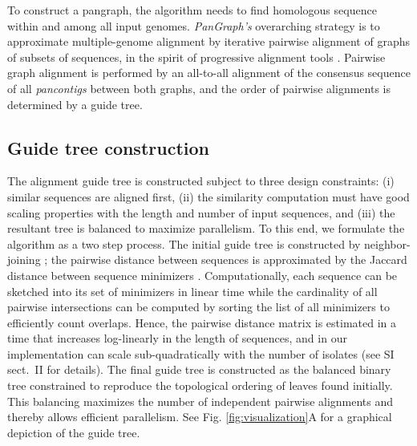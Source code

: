 \documentclass[aps,rmp,preprint,superscriptaddress,10pt,linenumbers]{revtex4-1}
\newcommand{\SIalgo}{II}
\begin{document}
To construct a pangraph, the algorithm needs to find homologous sequence within and among all input genomes.
\emph{PanGraph's} overarching strategy is to approximate multiple-genome alignment by iterative pairwise alignment of graphs of subsets of sequences, in the spirit of progressive alignment tools \cite{feng1987progressive,darling2010progressivemauve,armstrong2020progressive}.
Pairwise graph alignment is performed by an all-to-all alignment of the consensus sequence of all \emph{pancontigs} between both graphs, and the order of pairwise alignments is determined by a guide tree.

\subsection{Guide tree construction}
The alignment guide tree is constructed subject to three design constraints: (i) similar sequences are aligned first, (ii) the similarity computation must have good scaling properties with the length and number of input sequences, and (iii) the resultant tree is balanced to maximize parallelism.
To this end, we formulate the algorithm as a two step process.
The initial guide tree is constructed by neighbor-joining \cite{saitou1987neighbor}; the pairwise distance between sequences is approximated by the Jaccard distance between sequence minimizers \cite{roberts2004reducing}.
Computationally, each sequence can be sketched into its set of minimizers in linear time while the cardinality of all pairwise intersections can be computed by sorting the list of all minimizers to efficiently count overlaps.
Hence, the pairwise distance matrix is estimated in a time that increases log-linearly in the length of sequences, and in our implementation can scale sub-quadratically with the number of isolates (see SI sect.~\SIalgo{} for details).
The final guide tree is constructed as the balanced binary tree constrained to reproduce the topological ordering of leaves found initially.
This balancing maximizes the number of independent pairwise alignments and thereby allows efficient parallelism.
See Fig. \ref{fig:visualization}A for a graphical depiction of the guide tree.
\end{document}
